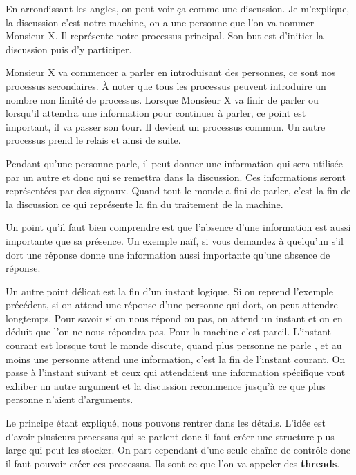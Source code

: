 \documentclass[10pt,a4paper]{report}
\begin{document}
	En arrondissant les angles, on peut voir ça comme une discussion. Je m'explique, la discussion c'est notre machine, on a une personne que l'on va nommer Monsieur X. Il représente notre processus principal. Son but est d'initier la discussion puis d'y participer.
	\medbreak
	 
	Monsieur X va commencer a parler en introduisant des personnes, ce sont nos processus secondaires. À noter que tous les processus peuvent introduire un nombre non limité de processus. Lorsque Monsieur X va finir de parler ou lorsqu'il attendra une information pour continuer à parler, ce point est important, il va passer son tour. Il devient un processus commun. Un autre processus prend le relais et ainsi de suite.
	\medbreak
	
	Pendant qu'une personne parle, il peut donner une information qui sera utilisée par un autre et donc qui se remettra dans la discussion. Ces informations seront représentées par des signaux. Quand tout le monde a fini de parler, c'est la fin de la discussion ce qui représente la fin du traitement de la machine.
	\bigbreak
	
	Un point qu'il faut bien comprendre est que l'absence d'une information est aussi importante que sa présence. Un exemple naïf, si vous demandez à quelqu'un s'il dort une réponse donne une information aussi importante qu'une absence de réponse.
	\medbreak
	
	Un autre point délicat est la fin d'un instant logique. Si on reprend l'exemple précédent, si on attend une réponse d'une personne qui dort, on peut attendre longtemps. Pour savoir si on nous répond ou pas, on attend un instant et on en déduit que l'on ne nous répondra pas. Pour la machine c'est pareil. L'instant courant est lorsque tout le monde discute, quand plus personne ne parle , et au moins une personne attend une information, c'est la fin de l'instant courant. On passe à l'instant suivant et ceux qui attendaient une information spécifique vont exhiber un autre argument et la discussion recommence jusqu'à ce que plus personne n'aient d'arguments.
	\medbreak
	
	Le principe étant expliqué, nous pouvons rentrer dans les détails. L'idée est d'avoir plusieurs processus qui se parlent donc il faut créer une structure plus large qui peut les stocker. On part cependant d'une seule chaîne de contrôle donc il faut pouvoir créer ces processus. Ils sont ce que l'on va appeler des \textbf{threads}.
	\bigbreak
	
\end{document}
